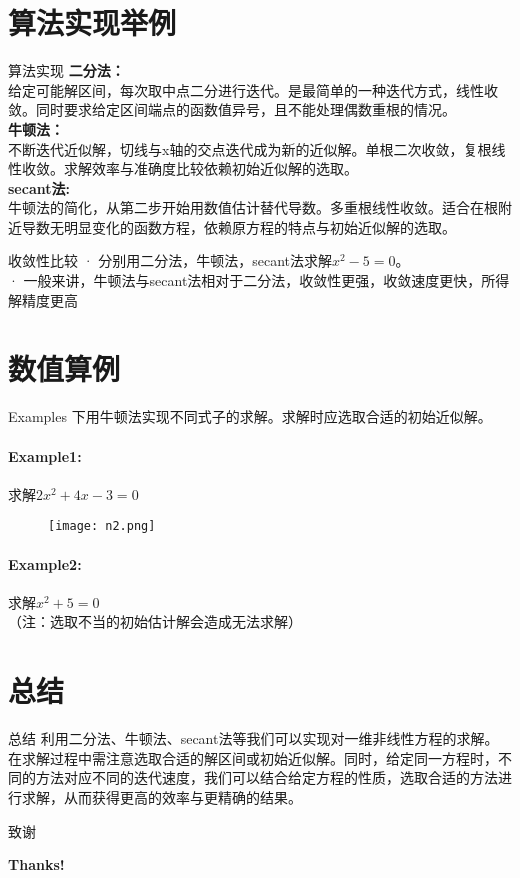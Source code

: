\documentclass{ctexbeamer}        %
\begin{document}
	\section{算法实现举例}
	\begin{frame}{算法实现}
		\textbf{二分法：} \\给定可能解区间，每次取中点二分进行迭代。是最简单的一种迭代方式，线性收敛。同时要求给定区间端点的函数值异号，且不能处理偶数重根的情况。\\
		\textbf{牛顿法：} \\不断迭代近似解，切线与x轴的交点迭代成为新的近似解。单根二次收敛，复根线性收敛。求解效率与准确度比较依赖初始近似解的选取。\\
		\textbf{secant法:}\\牛顿法的简化，从第二步开始用数值估计替代导数。多重根线性收敛。适合在根附近导数无明显变化的函数方程，依赖原方程的特点与初始近似解的选取。
	\end{frame}
	\begin{frame}{收敛性比较}
		· 分别用二分法，牛顿法，secant法求解$x^2-5=0$。\\ 
		· 一般来讲，牛顿法与secant法相对于二分法，收敛性更强，收敛速度更快，所得解精度更高
	\end{frame}
	\section{数值算例}    %
	\begin{frame}{Examples}
		下用牛顿法实现不同式子的求解。求解时应选取合适的初始近似解。
		
		\paragraph{Example1:}求解$2x^2+4x-3=0$
		\begin{figure}[ht]
			\texttt{[image: n2.png]}
		\end{figure}
		\paragraph{Example2:}求解$x^2+5=0$ \\
		（注：选取不当的初始估计解会造成无法求解）
		
	\end{frame}
	\section{总结}
	\begin{frame}{总结}
		利用二分法、牛顿法、secant法等我们可以实现对一维非线性方程的求解。在求解过程中需注意选取合适的解区间或初始近似解。同时，给定同一方程时，不同的方法对应不同的迭代速度，我们可以结合给定方程的性质，选取合适的方法进行求解，从而获得更高的效率与更精确的结果。
	\end{frame}
	
	\begin{frame}{致谢}    %
		\begin{center}
			\Huge\color{blue}\bfseries Thanks!
		\end{center}
	\end{frame}
	
\end{document}

